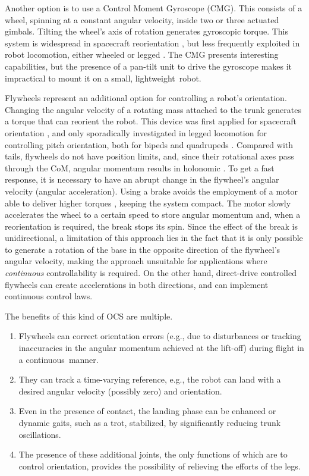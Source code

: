 \documentclass[sensors,article,accept,pdftex,moreauthors]{Definitions/mdpi}
\begin{document}
Another option is to use a  Control Moment Gyroscope (CMG).
This consists of a wheel, spinning at a constant angular velocity, inside two or three actuated gimbals.
Tilting the wheel's axis of rotation generates gyroscopic torque.
This system is widespread in spacecraft reorientation \cite{yoon2002spacecraft}, but less frequently exploited in robot locomotion, either wheeled \cite{brown1996single} or legged \cite{mikhalkov2021gyrubot}.
The CMG presents interesting capabilities, but the presence of a pan-tilt unit to drive the gyroscope makes it impractical to mount it on a small, lig\mbox{htweight rob}ot.


Flywheels represent an additional option for controlling a robot's orientation.
Changing the angular velocity of a rotating mass attached to the trunk generates a torque that can reorient the robot. This device was first applied for spacecraft orientation \cite{oland2009reaction}, and only sporadically investigated in legged locomotion for controlling pitch orientation, both for bipeds \cite{Brown2016,xiong2020sequential} and quadrupeds \cite{kolvenbach2019towards,vasilopoulos2016quadruped}.
Compared with tails, flywheels do not have position limits, and, since their rotational axes pass through the CoM, angular momentum results in holonomic \cite{machairas2015quadruped}.
To get a fast response, it is necessary to have an abrupt change in the flywheel's angular velocity (angular acceleration).
Using a brake avoids the employment of a motor able to deliver higher torques \cite{gajamohan2012cubli}, 
keeping the system compact. The motor slowly accelerates the wheel to a certain speed to store angular momentum and, when a reorientation is required, the break stops its spin.
Since the effect of the break is unidirectional, a limitation of this approach lies in the fact that it is only possible to generate a rotation of the base in the opposite direction of the flywheel's angular velocity, making the approach unsuitable for applications where \textit{continuous} controllability is required. On the other hand, direct-drive controlled flywheels can create accelerations in both directions,  and can implement continuous control laws. 


The benefits of this kind of OCS are multiple. 
\begin{enumerate}
\item Flywheels can correct orientation errors (e.g., due to disturbances or tracking inaccuracies in the angular momentum achieved at the lift-off) during flight    %
in a conti\mbox{nuous ma}nner. 
\item They can track a time-varying reference, e.g., the robot can land with a desired angular velocity (possibly zero) and orientation.
\item  Even in the presence of contact, the landing phase can be enhanced or dynamic gaits, such as a trot, stabilized, by significantly reducing trunk oscillations.  
\item  The presence of these additional joints, the only functions of which  are to control orientation, provides the possibility of relieving the efforts of the legs.
\end{enumerate}
\end{document}
